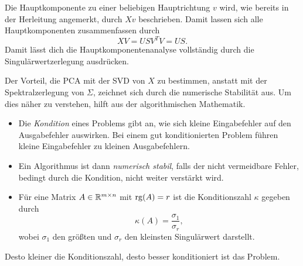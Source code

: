 Die Hauptkomponente zu einer beliebigen Hauptrichtung \(v\) wird, wie bereits in der Herleitung angemerkt, durch \(Xv\) beschrieben.  
Damit lassen sich alle Hauptkomponenten zusammenfassen durch 
\begin{equation*}
    XV = USV^{T}V = US.
\end{equation*}
Damit lässt dich die Hauptkomponentenanalyse vollständig durch die Singulärwertzerlegung ausdrücken.

Der Vorteil, die PCA mit der SVD von \(X\) zu bestimmen, anstatt mit der Spektralzerlegung von \(\Sigma\), zeichnet sich durch die numerische Stabilität aus.  
Um dies näher zu verstehen, hilft  aus der algorithmischen Mathematik.
\begin{repitition}\label{rep:alma}\leavevmode
    \vspace{-14pt}
    \begin{itemize}[wide]
        \item Die \emph{Kondition} eines Problems gibt an, wie sich kleine Eingabefehler auf den Ausgabefehler auswirken.
            Bei einem gut konditionierten Problem führen kleine Eingabefehler zu kleinen Ausgabefehlern.
        \item Ein Algorithmus ist dann \emph{numerisch stabil}, falls der nicht vermeidbare Fehler, bedingt durch die Kondition, nicht weiter verstärkt wird.
        \item Für eine Matrix \(A \in \mathbb{R}^{m \times n}\) mit \(\operatorname{rg}(A)=r\)  ist die Konditionszahl \(\kappa\) gegeben durch 
        \begin{equation*}
            \kappa(A) = \frac{\sigma_{1}}{\sigma_{r}},
        \end{equation*} 
        wobei \(\sigma_{1}\) den größten und \(\sigma_{r}\) den kleinsten Singulärwert darstellt.
    \end{itemize}
\end{repitition}
Desto kleiner die Konditionszahl, desto besser konditioniert ist das Problem.

